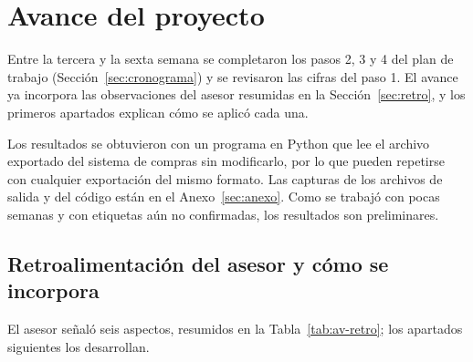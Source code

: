 
\section{Avance del proyecto}
\label{sec:avance}

Entre la tercera y la sexta semana se completaron los pasos 2, 3 y 4 del plan de trabajo (Sección~\ref{sec:cronograma}) y se revisaron las cifras del paso 1. El avance ya incorpora las observaciones del asesor resumidas en la Sección~\ref{sec:retro}, y los primeros apartados explican cómo se aplicó cada una.

Los resultados se obtuvieron con un programa en Python que lee el archivo exportado del sistema de compras sin modificarlo, por lo que pueden repetirse con cualquier exportación del mismo formato. Las capturas de los archivos de salida y del código están en el Anexo~\ref{sec:anexo}. Como se trabajó con pocas semanas y con etiquetas aún no confirmadas, los resultados son preliminares.

\subsection{Retroalimentación del asesor y cómo se incorpora}
\label{sec:av-retro}

El asesor señaló seis aspectos, resumidos en la Tabla~\ref{tab:av-retro}; los apartados siguientes los desarrollan.

